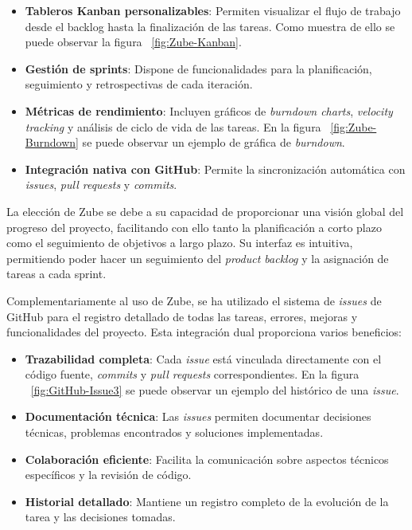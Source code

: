 \begin{itemize}
\tightlist
\item
\textbf{Tableros Kanban personalizables}: Permiten visualizar el flujo de trabajo desde el backlog hasta la finalización de las tareas. Como muestra de ello se puede observar la figura ~\ref{fig:Zube-Kanban}.


\item
\textbf{Gestión de sprints}: Dispone de funcionalidades para la planificación, seguimiento y retrospectivas de cada iteración.
\item
\textbf{Métricas de rendimiento}: Incluyen gráficos de \emph{burndown charts}, \emph{velocity tracking} y análisis de ciclo de vida de las tareas. En la figura ~\ref{fig:Zube-Burndown} se puede observar un ejemplo de gráfica de \emph{burndown}.


\item
\textbf{Integración nativa con GitHub}: Permite la sincronización automática con \emph{issues}, \emph{pull requests} y \emph{commits}.
\end{itemize}

La elección de Zube se debe a su capacidad de proporcionar una visión global del progreso del proyecto, facilitando con ello tanto la planificación a corto plazo como el seguimiento de objetivos a largo plazo. Su interfaz es intuitiva, permitiendo poder hacer un seguimiento del \emph{product backlog} y la asignación de tareas a cada sprint.

Complementariamente al uso de Zube, se ha utilizado el sistema de \emph{issues} de GitHub para el registro detallado de todas las tareas, errores, mejoras y funcionalidades del proyecto. Esta integración dual proporciona varios beneficios:

\begin{itemize}
\tightlist
\item
\textbf{Trazabilidad completa}: Cada \emph{issue} está vinculada directamente con el código fuente, \emph{commits} y \emph{pull requests} correspondientes. En la figura ~\ref{fig:GitHub-Issue3} se puede observar un ejemplo del histórico de una \emph{issue}.
\item
\textbf{Documentación técnica}: Las \emph{issues} permiten documentar decisiones técnicas, problemas encontrados y soluciones implementadas.
\item
\textbf{Colaboración eficiente}: Facilita la comunicación sobre aspectos técnicos específicos y la revisión de código.
\item
\textbf{Historial detallado}: Mantiene un registro completo de la evolución de la tarea y las decisiones tomadas.
\end{itemize}

